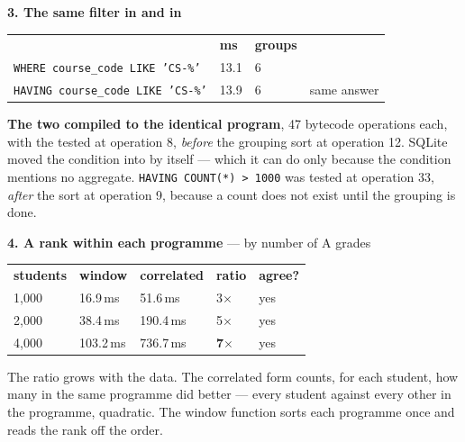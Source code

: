 \begin{measured}
\medskip
\textbf{3. The same filter in  and in }

\begin{tabular}{@{}L{6.0cm}R{1.5cm}R{1.7cm}L{3.0cm}@{}}
& \textbf{ms} & \textbf{groups} & \\
\texttt{WHERE course\_code LIKE 'CS-\%'}  & 13.1 & 6 & \\
\texttt{HAVING course\_code LIKE 'CS-\%'} & 13.9 & 6 & same answer \\
\end{tabular}

\smallskip
\textbf{The two compiled to the identical program}, 47 bytecode operations
each, with the  tested at operation 8, \emph{before} the grouping
sort at operation 12. SQLite moved the  condition into
 by itself --- which it can do only because the condition mentions
no aggregate. \texttt{HAVING COUNT(*) > 1000} was tested at operation 33,
\emph{after} the sort at operation 9, because a count does not exist until the
grouping is done.

\medskip
\textbf{4. A rank within each programme} --- by number of A grades

\begin{tabular}{@{}R{2.0cm}R{3.4cm}R{3.4cm}R{2.0cm}L{2.4cm}@{}}
\textbf{students} & \textbf{window } & \textbf{correlated}
& \textbf{ratio} & \textbf{agree?} \\
1{,}000 & 16.9\,ms  & 51.6\,ms  & 3$\times$ & yes \\
2{,}000 & 38.4\,ms  & 190.4\,ms & 5$\times$ & yes \\
4{,}000 & 103.2\,ms & 736.7\,ms & \textbf{7$\times$} & yes \\
\end{tabular}

\smallskip
The ratio grows with the data. The correlated form counts, for each student,
how many in the same programme did better --- every student against every
other in the programme, quadratic. The window function sorts each programme
once and reads the rank off the order.
\end{measured}

